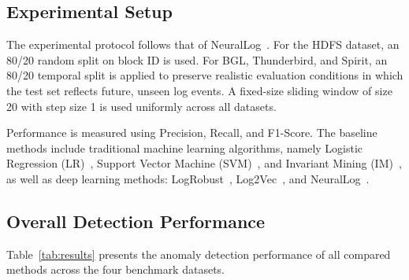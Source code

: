 \subsection{Experimental Setup}

The experimental protocol follows that of NeuralLog~\cite{neurallog2021}. For the HDFS dataset, an 80/20 random split on block ID is used. For BGL, Thunderbird, and Spirit, an 80/20 temporal split is applied to preserve realistic evaluation conditions in which the test set reflects future, unseen log events. A fixed-size sliding window of size 20 with step size 1 is used uniformly across all datasets.

Performance is measured using Precision, Recall, and F1-Score. The baseline methods include traditional machine learning algorithms, namely Logistic Regression (LR)~\cite{bodik2010fingerprinting}, Support Vector Machine (SVM)~\cite{chen2004failure}, and Invariant Mining (IM)~\cite{lou2010mining}, as well as deep learning methods: LogRobust~\cite{zhang2019robust}, Log2Vec~\cite{meng2020log2vec}, and NeuralLog~\cite{neurallog2021}.

\subsection{Overall Detection Performance}

Table~\ref{tab:results} presents the anomaly detection performance of all compared methods across the four benchmark datasets.

